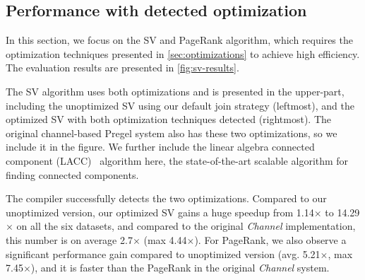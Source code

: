 \documentclass{sokendai_thesis} %
\newcommand{\cmark}{\ding{51}}%
\begin{document}

\subsection{Performance with detected optimization}

In this section, we focus on the SV and PageRank algorithm, which requires the optimization techniques presented in \autoref{sec:optimizations} to achieve high efficiency.
The evaluation results are presented in \autoref{fig:sv-results}.

The SV algorithm uses both optimizations and is presented in the upper-part, including the unoptimized SV using our default join strategy (leftmost), and the optimized SV with both optimization techniques detected (rightmost).
The original channel-based Pregel system also has these two optimizations, so we include it in the figure. 
We further include the linear algebra connected component (LACC)~\cite{lacc} algorithm here, the state-of-the-art scalable algorithm for finding connected components.

The compiler successfully detects the two optimizations.
Compared to our unoptimized version, our optimized SV gains a huge speedup from 1.14$\times$ to 14.29$\times$ on all the six datasets, and compared to the original \emph{Channel} implementation, this number is on average 2.7$\times$ (max 4.44$\times$).
For PageRank, we also observe a significant performance gain compared to unoptimized version (avg. 5.21$\times$, max 7.45$\times$), and it is faster than the PageRank in the original \textit{Channel} system.
\end{document}
